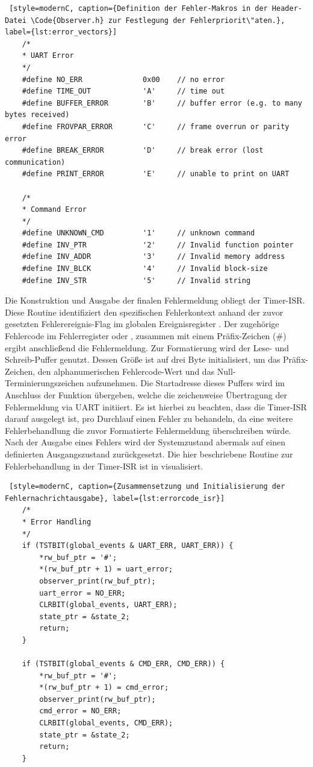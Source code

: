 \newpage
\begin{lstlisting} [style=modernC, caption={Definition der Fehler-Makros in der Header-Datei \Code{Observer.h} zur Festlegung der Fehlerpriorit\"aten.}, label={lst:error_vectors}]
	/*
	* UART Error
	*/
	#define NO_ERR              0x00    // no error
	#define TIME_OUT            'A'     // time out
	#define BUFFER_ERROR        'B'     // buffer error (e.g. to many bytes received)
	#define FROVPAR_ERROR       'C'     // frame overrun or parity error
	#define BREAK_ERROR         'D'     // break error (lost communication)
	#define PRINT_ERROR         'E'     // unable to print on UART
	
	/*
	* Command Error
	*/
	#define UNKNOWN_CMD         '1'     // unknown command
	#define INV_PTR             '2'     // Invalid function pointer
	#define INV_ADDR            '3'     // Invalid memory address
	#define INV_BLCK            '4'     // Invalid block-size
	#define INV_STR             '5'     // Invalid string
\end{lstlisting}

Die Konstruktion und Ausgabe der finalen Fehlermeldung obliegt der Timer-ISR. Diese Routine identifiziert den spezifischen Fehlerkontext anhand der zuvor gesetzten Fehlerereignis-Flag im globalen Ereignisregister . Der zugeh\"orige Fehlercode im Fehlerregister  oder , zusammen mit einem Pr\"afix-Zeichen (\glqq{}\#\grqq{}) ergibt anschlie{\ss}end die Fehlermeldung. Zur Formatierung wird der Lese- und Schreib-Puffer  genutzt. Dessen Gr\"o{\ss}e ist auf drei Byte initialisiert, um das Pr\"afix-Zeichen, den alphanumerischen Fehlercode-Wert und das Null-Terminierungszeichen aufzunehmen. Die Startadresse dieses Puffers wird im Anschluss der Funktion  \"ubergeben, welche die zeichenweise \"Ubertragung der Fehlermeldung via UART initiiert. Es ist hierbei zu beachten, dass die Timer-ISR darauf ausgelegt ist, pro Durchlauf einen Fehler zu behandeln, da eine weitere Fehlerbehandlung die zuvor Formatierte Fehlermeldung \"uberschreiben w\"urde. Nach der Ausgabe eines Fehlers wird der Systemzustand abermals auf einen definierten Ausgangszustand zur\"uckgesetzt. Die hier beschriebene Routine zur Fehlerbehandlung in der Timer-ISR ist in  visualisiert.

\newpage
\begin{lstlisting} [style=modernC, caption={Zusammensetzung und Initialisierung der Fehlernachrichtausgabe}, label={lst:errorcode_isr}]
    /*
    * Error Handling
    */
	if (TSTBIT(global_events & UART_ERR, UART_ERR)) {
		*rw_buf_ptr = '#';
		*(rw_buf_ptr + 1) = uart_error;
		observer_print(rw_buf_ptr);
		uart_error = NO_ERR;
		CLRBIT(global_events, UART_ERR);
		state_ptr = &state_2;
		return;
	}
	
	if (TSTBIT(global_events & CMD_ERR, CMD_ERR)) {
		*rw_buf_ptr = '#';
		*(rw_buf_ptr + 1) = cmd_error;
		observer_print(rw_buf_ptr);
		cmd_error = NO_ERR;
		CLRBIT(global_events, CMD_ERR);
		state_ptr = &state_2;
		return;
	}
\end{lstlisting}

